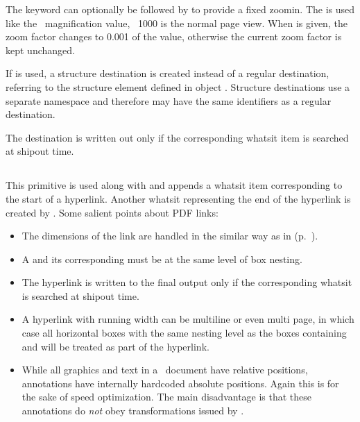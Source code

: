 \documentclass{pdftexmanual}
\begin{document}
The  keyword can optionally be followed by 
 to provide a fixed zoom\hyph in. The
 is used like the \TEX\ magnification value, \ie\
1000 is the normal page view. When   is
given, the zoom factor changes to 0.001 of the \Something{integer}
value, otherwise the current zoom factor is kept unchanged.

If   is used, a structure destination
is created instead of a regular destination, referring to the structure
element defined in object \Something{number}. Structure destinations use
a separate namespace and therefore may have the same identifiers as a
regular destination.

The destination is written out only if the corresponding whatsit item is
searched at shipout time.

\subsection{}

\noindent {}
\noindent {}

This primitive is used along with  and appends a whatsit
item corresponding to the start of a hyperlink. Another whatsit
representing the end of the hyperlink is created by .
Some salient points about PDF links:

\begin{itemize}
\item The dimensions of the link are handled in the similar way as in
\cs{pdfannot} (p.~\pageref{pdfannot}).

\item A  and its corresponding  must be
at the same level of box nesting.

\item The hyperlink is written to the final output only if the
corresponding whatsit is searched at shipout time.

\item A hyperlink with running width can be multi\hyph line or even multi\hyph
page, in which case all horizontal boxes with the same nesting level as
the boxes containing \cs{pdfstartlink} and \cs{pdfendlink} will be
treated as part of the hyperlink.

\item While all graphics and text in a \PDF\ document have relative positions,
annotations have internally hard\hyph coded absolute positions. Again
this is for the sake of speed optimization. The main disadvantage is
that these annotations do \emph{not} obey transformations issued by
\type{\pdfliteral}.

\end{itemize}
\end{document}
